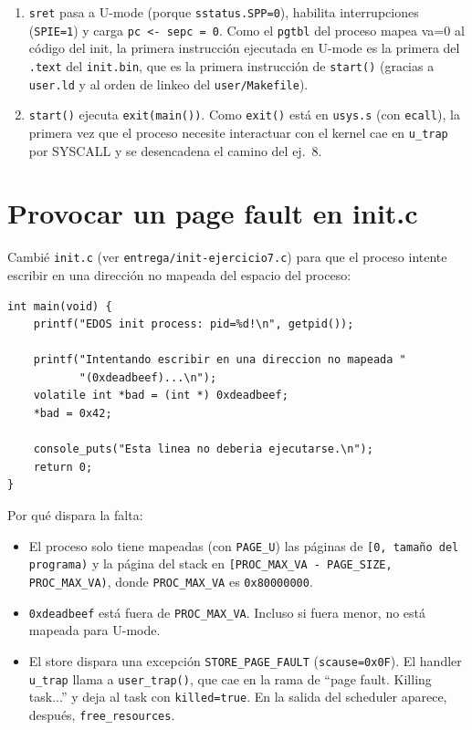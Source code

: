 \documentclass[11pt,a4paper]{article}
\begin{document}
\begin{enumerate}[leftmargin=1.6em]
    \item \texttt{sret} pasa a U-mode (porque \texttt{sstatus.SPP=0}), habilita
    interrupciones (\texttt{SPIE=1}) y carga \texttt{pc <- sepc = 0}. Como el
    \texttt{pgtbl} del proceso mapea va=0 al código del init, la primera
    instrucción ejecutada en U-mode es la primera del \texttt{.text} del
    \texttt{init.bin}, que es la primera instrucción de \texttt{start()} (gracias
    a \texttt{user.ld} y al orden de linkeo del \texttt{user/Makefile}).
    \item \texttt{start()} ejecuta \texttt{exit(main())}. Como \texttt{exit()}
    está en \texttt{usys.s} (con \texttt{ecall}), la primera vez que el proceso
    necesite interactuar con el kernel cae en \texttt{u\_trap} por SYSCALL y se
    desencadena el camino del ej.\ 8.
\end{enumerate}

\section{Provocar un page fault en init.c}

Cambié \texttt{init.c} (ver \texttt{entrega/init-ejercicio7.c}) para que el
proceso intente escribir en una dirección no mapeada del espacio del proceso:

\begin{lstlisting}[style=cstyle]
int main(void) {
    printf("EDOS init process: pid=%d!\n", getpid());

    printf("Intentando escribir en una direccion no mapeada "
           "(0xdeadbeef)...\n");
    volatile int *bad = (int *) 0xdeadbeef;
    *bad = 0x42;

    console_puts("Esta linea no deberia ejecutarse.\n");
    return 0;
}
\end{lstlisting}

Por qué dispara la falta:

\begin{itemize}[leftmargin=1.4em]
    \item El proceso solo tiene mapeadas (con \texttt{PAGE\_U}) las páginas de
    \texttt{[0, tamaño del programa)} y la página del stack en
    \texttt{[PROC\_MAX\_VA - PAGE\_SIZE, PROC\_MAX\_VA)}, donde
    \texttt{PROC\_MAX\_VA} es \texttt{0x80000000}.
    \item \texttt{0xdeadbeef} está fuera de \texttt{PROC\_MAX\_VA}. Incluso si
    fuera menor, no está mapeada para U-mode.
    \item El store dispara una excepción \texttt{STORE\_PAGE\_FAULT}
    (\texttt{scause=0x0F}). El handler \texttt{u\_trap} llama a
    \texttt{user\_trap()}, que cae en la rama de ``page fault. Killing task...''
    y deja al task con \texttt{killed=true}. En la salida del scheduler aparece,
    después, \texttt{free\_resources}.
\end{itemize}
\end{document}
